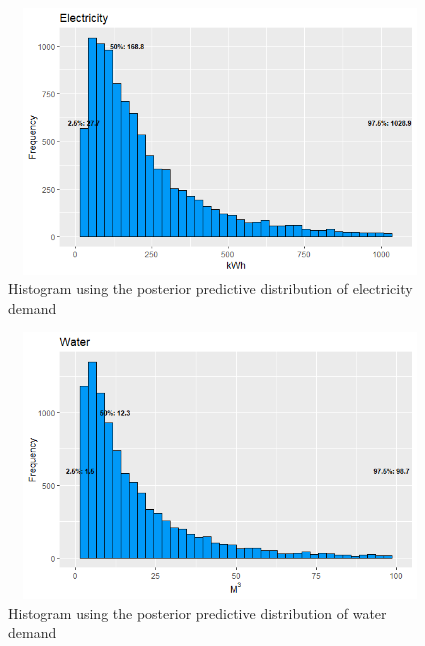 \begin{enumerate}[leftmargin=*]
\begin{figure}[!h]
	\includegraphics[width=340pt, height=200pt]{Chapters/chapter4/figures/ElectMulti.png}
	\caption[List of figure caption goes here]{Histogram using the posterior predictive distribution of electricity demand}\label{fig13}
\end{figure}

\begin{figure}[!h]
	\includegraphics[width=340pt, height=200pt]{Chapters/chapter4/figures/WaterMulti.png}
	\caption[List of figure caption goes here]{Histogram using the posterior predictive distribution of water demand}\label{fig14}
\end{figure}  


\end{enumerate}

